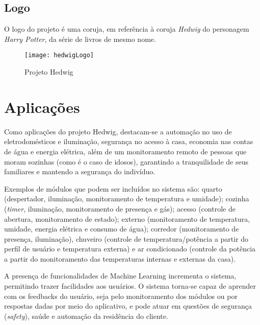 \subsection{Logo}
O logo do projeto é uma coruja, em referência à coruja \textit{Hedwig} do personagem \textit{Harry Potter}, da série de livros de mesmo nome.
\begin{figure}[H]
	\centering
	\caption{Projeto Hedwig}
  \texttt{[image: hedwigLogo]}
\label{fig:hedwigLogo}
\end{figure}

\section{Aplicações}
Como aplicações do projeto Hedwig, destacam-se a automação no uso de eletrodomésticos e iluminação, segurança no acesso à casa, economia nas contas de água e energia elétrica, além de um monitoramento remoto de pessoas que moram sozinhas (como é o caso de idosos), garantindo a tranquilidade de seus familiares e mantendo a segurança do indivíduo.

Exemplos de módulos que podem ser incluídos no sistema são: quarto (despertador, iluminação, monitoramento de temperatura e umidade); cozinha (\textit{timer}, iluminação, monitoramento de presença e gás); acesso (controle de abertura, monitoramento de estado); externo (monitoramento de temperatura, umidade, energia elétrica e consumo de água); corredor (monitoramento de presença, iluminação), chuveiro (controle de temperatura\slash potência a partir do perfil de usuário e temperatura externa) e ar condicionado (controle da potência a partir do monitoramento das temperaturas internas e externas da casa).

A presença de funcionalidades de Machine Learning incrementa o sistema, permitindo trazer facilidades aos usuários. O sistema torna-se capaz de aprender com os feedbacks do usuário, seja pelo monitoramento dos módulos ou por respostas dadas por meio do aplicativo, e pode atuar em questões de segurança (\textit{safety}), saúde e automação da residência do cliente.
